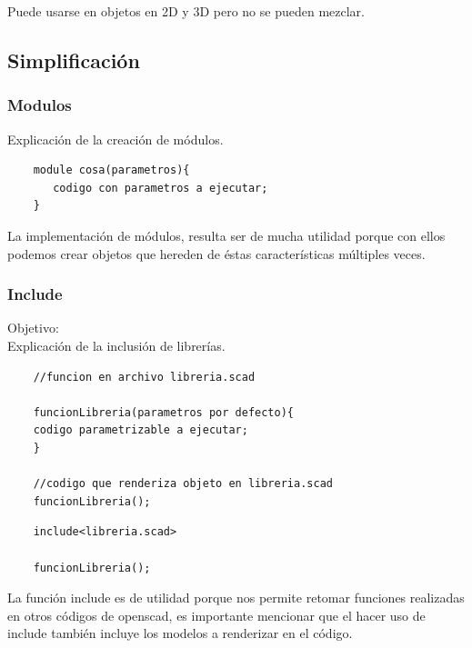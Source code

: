 \documentclass{article}
\begin{document}
Puede usarse en objetos en 2D y 3D pero no se pueden mezclar.\citep{WikiOpensCAD}\\

\subsection{Simplificación}

\subsubsection{Modulos}

Explicación de la creación de módulos.\citep{OpenSCS}\\

\begin{verbatim}
    module cosa(parametros){
       codigo con parametros a ejecutar;
    }
\end{verbatim}

La implementación de módulos, resulta ser de mucha utilidad porque con ellos podemos crear objetos que hereden de éstas características múltiples veces.\\

\subsubsection{Include}

Objetivo:\\

Explicación de la inclusión de librerías.\citep{OpenSCS}\\

\begin{verbatim}
    //funcion en archivo libreria.scad
    
    funcionLibreria(parametros por defecto){
    codigo parametrizable a ejecutar;
    }
    
    //codigo que renderiza objeto en libreria.scad
    funcionLibreria();
\end{verbatim}

\begin{verbatim}
    include<libreria.scad>
    
    funcionLibreria();
\end{verbatim}

La función include es de utilidad porque nos permite retomar funciones realizadas en otros códigos de openscad, es importante mencionar que el hacer uso de include también incluye los modelos a renderizar en el código.\\
\end{document}
